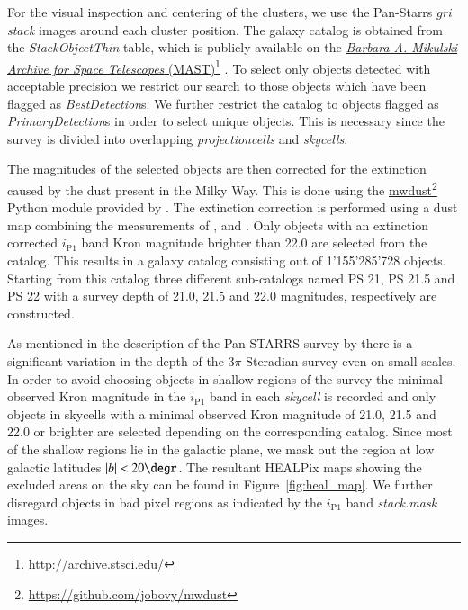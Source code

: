 \documentclass[iop, apjl, twocolappendix, numberedappendix]{emulateapj}
\newcommand\fnurl[2]{%
  \href{#2}{#1}\footnote{\url{#2}}%
}
\begin{document}
For the visual inspection and centering of the clusters, we use the
Pan-Starrs $gri$ \textit{stack} images around each cluster position.
The galaxy catalog is obtained from the  \textit{StackObjectThin}
table, which is publicly available on the \fnurl{\textit{Barbara A.
Mikulski Archive for Space Telescopes}
(MAST)}{http://archive.stsci.edu/}. To select only objects detected
with acceptable precision we restrict our search to those objects
which have been flagged as \textit{BestDetection}s. We further
restrict the catalog to objects flagged as
\textit{PrimaryDetection}s in order to select unique objects. This
is necessary since the survey is divided into overlapping
\textit{projectioncells} and \textit{skycells}.

The magnitudes of the selected objects are then corrected for the
extinction caused by the dust present in the Milky Way. This is done
using the \fnurl{mwdust}{https://github.com/jobovy/mwdust} Python
module provided by \citet{bovy2016galactic}. The extinction
correction is performed using a dust map combining the measurements
of \citet{marshall2006modelling}, \citet{green2015three} and
\citet{drimmel2003three}. Only objects with an extinction corrected
$i_{\mathrm{P1}}$ band Kron magnitude brighter than 22.0 are
selected from the catalog. This results in a galaxy catalog
consisting out of 1'155'285'728 objects. Starting from this catalog
three different sub-catalogs named PS 21, PS 21.5 and PS 22 with a
survey depth of 21.0, 21.5 and 22.0 magnitudes, respectively are
constructed.

As mentioned in the description of the Pan-STARRS survey by
\citet{chambers2016pan} there is a significant variation in the
depth of the 3$\pi$ Steradian survey even on small scales. In order
to avoid choosing objects in shallow regions of the survey the
minimal observed Kron magnitude in the $i_{\mathrm{P1}}$ band in
each \textit{skycell} is recorded and only objects in skycells with
a minimal observed Kron magnitude of 21.0, 21.5 and 22.0 or brighter
are selected depending on the corresponding catalog. Since most of
the shallow regions lie in the galactic plane, we mask out the
region at low galactic latitudes $|b|<20\degr$. The resultant
HEALPix maps showing the excluded areas on the sky can be found in
Figure~\ref{fig:heal_map}. We further disregard objects in bad
pixel regions as indicated by the $i_{\mathrm{P1}}$ band
\textit{stack.mask} images.
\end{document}

